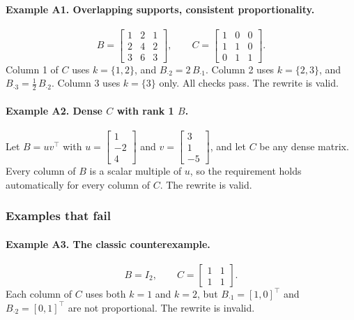 \documentclass[11pt,a4paper]{article}
\theoremstyle{definition}
\begin{document}
\paragraph{Example A1. Overlapping supports, consistent proportionality.}
\[
B=\begin{bmatrix}
1 & 2 & 1\\
2 & 4 & 2\\
3 & 6 & 3
\end{bmatrix},
\qquad
C=\begin{bmatrix}
1 & 0 & 0\\
1 & 1 & 0\\
0 & 1 & 1
\end{bmatrix}.
\]
Column 1 of $C$ uses $k=\{1,2\}$, and $B_{\cdot 2}=2\,B_{\cdot 1}$.  
Column 2 uses $k=\{2,3\}$, and $B_{\cdot 3}=\tfrac12\,B_{\cdot 2}$.  
Column 3 uses $k=\{3\}$ only.  
All checks pass. The rewrite is valid.

\paragraph{Example A2. Dense $C$ with rank 1 $B$.}
Let $B=uv^\top$ with  
$u=\begin{bmatrix}1\\-2\\4\end{bmatrix}$ and $v=\begin{bmatrix}3\\1\\-5\end{bmatrix}$, and let $C$ be any dense matrix.  
Every column of $B$ is a scalar multiple of $u$, so the requirement holds automatically for every column of $C$. The rewrite is valid.

\subsubsection*{Examples that fail}
\paragraph{Example A3. The classic counterexample.}
\[
B=I_2,\qquad C=\begin{bmatrix}1&1\\[2pt]1&1\end{bmatrix}.
\]
Each column of $C$ uses both $k=1$ and $k=2$, but $B_{\cdot 1}=[1,0]^\top$ and $B_{\cdot 2}=[0,1]^\top$ are not proportional. The rewrite is invalid.
\end{document}
